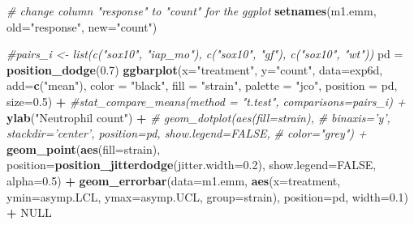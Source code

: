 \documentclass[]{book}
\newenvironment{Shaded}{\begin{snugshade}}{\end{snugshade}}
\newcommand{\KeywordTok}[1]{\textcolor[rgb]{0.13,0.29,0.53}{\textbf{#1}}}
\newcommand{\DataTypeTok}[1]{\textcolor[rgb]{0.13,0.29,0.53}{#1}}
\newcommand{\FloatTok}[1]{\textcolor[rgb]{0.00,0.00,0.81}{#1}}
\newcommand{\StringTok}[1]{\textcolor[rgb]{0.31,0.60,0.02}{#1}}
\newcommand{\CommentTok}[1]{\textcolor[rgb]{0.56,0.35,0.01}{\textit{#1}}}
\newcommand{\OtherTok}[1]{\textcolor[rgb]{0.56,0.35,0.01}{#1}}
\newcommand{\OperatorTok}[1]{\textcolor[rgb]{0.81,0.36,0.00}{\textbf{#1}}}
\newcommand{\NormalTok}[1]{#1}
\begin{document}
\begin{Shaded}
\begin{Highlighting}[]
\CommentTok{# change column "response" to "count" for the ggplot}
\KeywordTok{setnames}\NormalTok{(m1.emm, }\DataTypeTok{old=}\StringTok{"response"}\NormalTok{, }\DataTypeTok{new=}\StringTok{"count"}\NormalTok{)}
\end{Highlighting}
\end{Shaded}

\begin{Shaded}
\begin{Highlighting}[]
\CommentTok{#pairs_i <- list(c("sox10", "iap_mo"), c("sox10", "gf"), c("sox10", "wt"))}
\NormalTok{pd =}\StringTok{ }\KeywordTok{position_dodge}\NormalTok{(}\FloatTok{0.7}\NormalTok{)}
\KeywordTok{ggbarplot}\NormalTok{(}\DataTypeTok{x=}\StringTok{"treatment"}\NormalTok{, }
          \DataTypeTok{y=}\StringTok{"count"}\NormalTok{,}
          \DataTypeTok{data=}\NormalTok{exp6d,}
          \DataTypeTok{add=}\KeywordTok{c}\NormalTok{(}\StringTok{"mean"}\NormalTok{),}
          \DataTypeTok{color =} \StringTok{"black"}\NormalTok{,}
          \DataTypeTok{fill =} \StringTok{"strain"}\NormalTok{,}
          \DataTypeTok{palette =} \StringTok{"jco"}\NormalTok{,}
          \DataTypeTok{position =}\NormalTok{ pd,}
          \DataTypeTok{size=}\FloatTok{0.5}\NormalTok{) }\OperatorTok{+}
\StringTok{  }\CommentTok{#stat_compare_means(method = "t.test", comparisons=pairs_i) +}
\StringTok{  }\KeywordTok{ylab}\NormalTok{(}\StringTok{"Neutrophil count"}\NormalTok{) }\OperatorTok{+}
\StringTok{  }\CommentTok{# geom_dotplot(aes(fill=strain),}
\StringTok{  }\CommentTok{#              binaxis='y', stackdir='center', position=pd, show.legend=FALSE,}
\StringTok{  }\CommentTok{#              color="grey") +}
\StringTok{  }\KeywordTok{geom_point}\NormalTok{(}\KeywordTok{aes}\NormalTok{(}\DataTypeTok{fill=}\NormalTok{strain), }\DataTypeTok{position=}\KeywordTok{position_jitterdodge}\NormalTok{(}\DataTypeTok{jitter.width=}\FloatTok{0.2}\NormalTok{), }\DataTypeTok{show.legend=}\OtherTok{FALSE}\NormalTok{, }\DataTypeTok{alpha=}\FloatTok{0.5}\NormalTok{) }\OperatorTok{+}
\StringTok{  }\KeywordTok{geom_errorbar}\NormalTok{(}\DataTypeTok{data=}\NormalTok{m1.emm, }\KeywordTok{aes}\NormalTok{(}\DataTypeTok{x=}\NormalTok{treatment, }\DataTypeTok{ymin=}\NormalTok{asymp.LCL, }\DataTypeTok{ymax=}\NormalTok{asymp.UCL, }\DataTypeTok{group=}\NormalTok{strain),}
                \DataTypeTok{position=}\NormalTok{pd, }\DataTypeTok{width=}\FloatTok{0.1}\NormalTok{) }\OperatorTok{+}
\StringTok{  }\OtherTok{NULL}
\end{Highlighting}
\end{Shaded}
\end{document}
